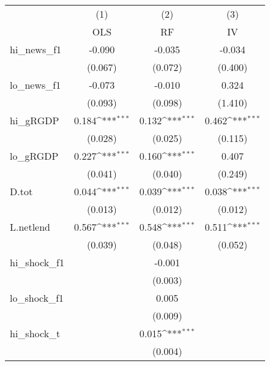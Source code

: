 {
\def\sym#1{\ifmmode^{#1}\else\(^{#1}\)\fi}
\begin{tabular}{l*{3}{c}}
\toprule
            &\multicolumn{1}{c}{(1)}&\multicolumn{1}{c}{(2)}&\multicolumn{1}{c}{(3)}\\
            &\multicolumn{1}{c}{OLS}&\multicolumn{1}{c}{RF}&\multicolumn{1}{c}{IV}\\
\midrule
hi\_news\_f1  &      -0.090         &      -0.035         &      -0.034         \\
            &     (0.067)         &     (0.072)         &     (0.400)         \\
\addlinespace
lo\_news\_f1  &      -0.073         &      -0.010         &       0.324         \\
            &     (0.093)         &     (0.098)         &     (1.410)         \\
\addlinespace
hi\_gRGDP    &       0.184\sym{***}&       0.132\sym{***}&       0.462\sym{***}\\
            &     (0.028)         &     (0.025)         &     (0.115)         \\
\addlinespace
lo\_gRGDP    &       0.227\sym{***}&       0.160\sym{***}&       0.407         \\
            &     (0.041)         &     (0.040)         &     (0.249)         \\
\addlinespace
D.tot       &       0.044\sym{***}&       0.039\sym{***}&       0.038\sym{***}\\
            &     (0.013)         &     (0.012)         &     (0.012)         \\
\addlinespace
L.netlend   &       0.567\sym{***}&       0.548\sym{***}&       0.511\sym{***}\\
            &     (0.039)         &     (0.048)         &     (0.052)         \\
\addlinespace
hi\_shock\_f1 &                     &      -0.001         &                     \\
            &                     &     (0.003)         &                     \\
\addlinespace
lo\_shock\_f1 &                     &       0.005         &                     \\
            &                     &     (0.009)         &                     \\
\addlinespace
hi\_shock\_t  &                     &       0.015\sym{***}&                     \\
            &                     &     (0.004)         &                     \\

\end{tabular}}
